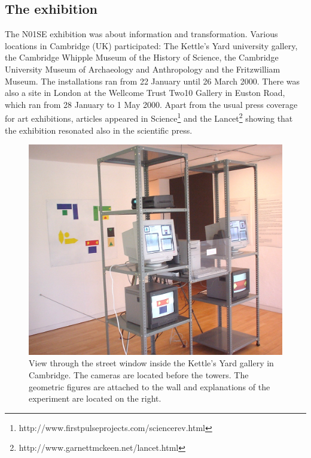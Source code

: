\subsection{The exhibition} 
\enlargethispage{2\baselineskip}
The N01SE exhibition was about information and transformation. 
Various locations in Cambridge (UK) participated: The Kettle's Yard university gallery, 
the Cambridge Whipple Museum of the History of Science, the Cambridge University Museum of 
Archaeology and Anthropology and the 
Fritzwilliam Museum. The installations ran from 22 January until 26 March 2000. There was also a site 
in London at the Wellcome Trust Two10 Gallery in Euston Road, which 
ran from 28 January to 1 May 2000. Apart from the usual press coverage for art exhibitions, articles appeared in Science\footnote{http://www.firstpulseprojects.com/sciencerev.html} and the Lancet\footnote{http://www.garnettmckeen.net/lancet.html} showing that the exhibition resonated also in the scientific press. 

\begin{figure}[htbp]
  \centerline{\includegraphics[width=.75\textwidth]{chap9/figs/cambridge-view.jpg}}
\caption{\label{fig:sideview}View through the street window inside the Kettle's Yard gallery in Cambridge. The cameras are located before 
the towers. The geometric figures are attached to the wall and explanations of the experiment are located on the right.}
\end{figure}

